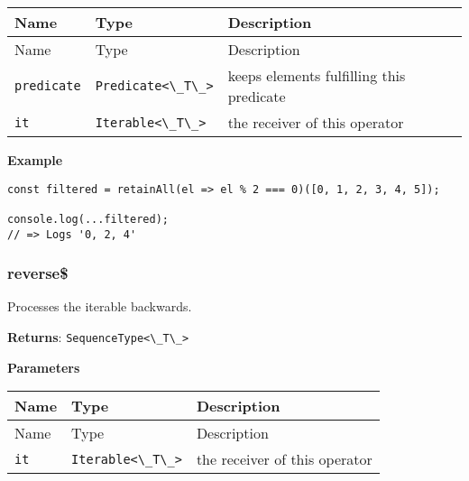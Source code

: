 \begin{longtable}[]{
  >{\raggedright\arraybackslash}p{}
  >{\raggedright\arraybackslash}p{}
  >{\raggedright\arraybackslash}p{}@{}}

\toprule\noalign{}
Name & Type & Description \\
\midrule\noalign{}
\endfirsthead
\toprule\noalign{}
Name & Type & Description \\
\midrule\noalign{}
\endhead
\bottomrule\noalign{}
\endlastfoot
\passthrough{\lstinline!predicate!} &
\passthrough{\lstinline!Predicate<\_T\_>!} & keeps elements fulfilling
this predicate \\
\passthrough{\lstinline!it!} & \passthrough{\lstinline!Iterable<\_T\_>!}
& the receiver of this operator \\
\end{longtable}

\textbf{Example}

\begin{lstlisting}[label=8a34b1cf-0a5d-4f78-876d-3d2977eb069b]
const filtered = retainAll(el => el % 2 === 0)([0, 1, 2, 3, 4, 5]);

console.log(...filtered);
// => Logs '0, 2, 4'
\end{lstlisting}

\hypertarget{cfab75a9-3295-4c45-be64-d5e9dc24f024}{%
\subsubsection{reverse\$}\label{cfab75a9-3295-4c45-be64-d5e9dc24f024}}

Processes the iterable backwards.

\textbf{Returns}: \passthrough{\lstinline!SequenceType<\_T\_>!}

\textbf{Parameters}

\begin{longtable}[]{
  >{\raggedright\arraybackslash}p{}
  >{\raggedright\arraybackslash}p{}
  >{\raggedright\arraybackslash}p{}@{}}

\toprule\noalign{}
Name & Type & Description \\
\midrule\noalign{}
\endfirsthead
\toprule\noalign{}
Name & Type & Description \\
\midrule\noalign{}
\endhead
\bottomrule\noalign{}
\endlastfoot
\passthrough{\lstinline!it!} & \passthrough{\lstinline!Iterable<\_T\_>!}
& the receiver of this operator \\
\end{longtable}

